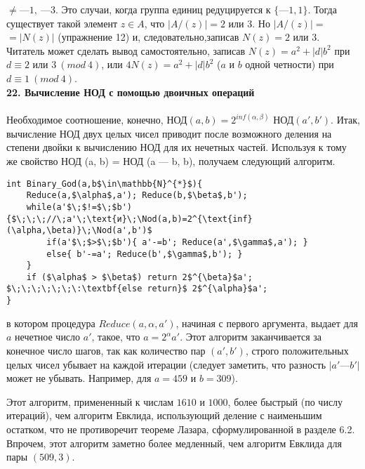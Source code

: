 \documentclass{mai_book}
\begin{document}
$\neq—1,~—3$. Это случаи, когда группа единиц редуцируется к $\{—1,1\}$. Тогда\linebreak 
существует такой элемент  $z\in A$, что $|A/(z)|=2$ или $3$. Но $|A/(z)|=$\linebreak
$=|N(z)|$ (упражнение 12) и, следовательно,записав $N(z)=2$ или $3$. Читатель\linebreak
может сделать вывод самостоятельно, записав $N(z) = a^2 + |d|b^2$ при\linebreak
$d\equiv2$ или $3~(mod~4)$, или $4N(z) = a^2 + |d|b^2$ ($a$ и $b$ одной четности) при\linebreak
$d\equiv1~(mod~4)$.\newline
\\
\noindent\textbf{22. Вычисление НОД с помощью двоичных операций}\\
\\
\hspace*{15pt} Необходимое соотношение, конечно, НОД$(a, b) =2^{inf(\alpha , \beta)}$ НОД$(a', b')$.\linebreak
Итак,\: вычисление\: НОД\: двух\: целых\: чисел\: приводит\: после возможного
\newpage
%
%
\noindent деления на степени двойки к вычислению НОД для их нечетных частей.
Используя к тому же свойство НОД (a, b) = НОД (a — b, b), получаем
следующий алгоритм.
\begin{leftbar}
\begin{lstlisting}[frame=none, mathescape=true]
int Binary_God(a,b$\in\mathbb{N}^{*}$){
	Reduce(a,$\alpha$,a'); Reduce(b,$\beta$,b');
	while(a'$\;$!=$\;$b'){$\;\;\;//\;a'\;\text{и}\;\Nod(a,b)=2^{\text{inf}(\alpha,\beta)}\;\Nod(a',b')$
		if(a'$\;$>$\;$b'){ a'-=b'; Reduce(a',$\gamma$,a'); }
		else{ b'-=a'; Reduce(b',$\gamma$,b'); }
	}
	if ($\alpha$ > $\beta$) return 2$^{\beta}$a';
$\;\;\;\;\;\;\:\textbf{else return}$ 2$^{\alpha}$a';
}				
\end{lstlisting}
\end{leftbar}
\noindent в котором процедура $Reduce(a, \alpha, a')$, начиная с первого аргумента, вы­дает для $a$ нечетное число $a'$, такое, что $a = 2^{\alpha} a'$. Этот алгоритм заканчивается за конечное число шагов, так как количество пар $(a', b')$,
строго положительных целых чисел убывает на каждой итерации (сле­дует заметить, что разность $|a' — b'|$ может не убывать. Например, для
$a = 459$ и $b = 309$).

Этот алгоритм, примененный к числам $1610$ и $1000$, более быстрый
(по числу итераций), чем алгоритм Евклида, использующий деление с
наименьшим остатком, что не противоречит теореме Лазара, сформу­лированной в разделе 6.2. Впрочем, этот алгоритм заметно более медленный, чем алгоритм Евклида для пары $(509,3)$.
\end{document}
